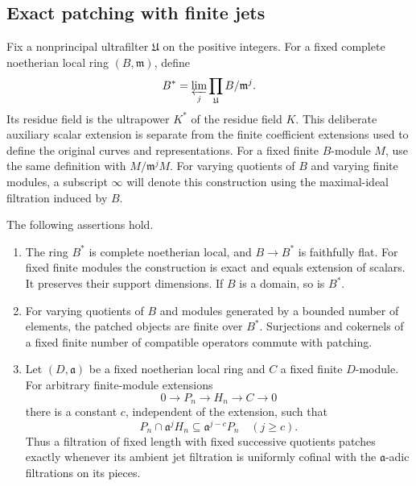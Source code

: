 \subsection{Exact patching with finite jets}

Fix a nonprincipal ultrafilter $\mathfrak U$ on the positive integers.
For a fixed complete noetherian local ring $(B,\mathfrak m)$, define
\[
 B^*=\varprojlim_j\prod_{\mathfrak U} B/\mathfrak m^j.
\]
Its residue field is the ultrapower $K^*$ of the residue field $K$.
This deliberate auxiliary scalar extension is separate from the
finite coefficient extensions used to define the original curves
and representations.
For a fixed finite $B$-module $M$, use the same definition with
$M/\mathfrak m^jM$.  For varying quotients of $B$ and varying finite
modules, a subscript $\infty$ will denote this construction using
the maximal-ideal filtration induced by $B$.

\begin{lemma}\label{lem:jet-exactness}
The following assertions hold.
\begin{enumerate}
\item The ring $B^*$ is complete noetherian local, and $B\to B^*$
is faithfully flat.  For fixed finite modules the construction is
exact and equals extension of scalars.  It preserves their support
dimensions.  If $B$ is a domain, so is $B^*$.
\item For varying quotients of $B$ and modules generated by a bounded
number of elements, the patched objects are finite over $B^*$.
Surjections and cokernels of a fixed finite number of compatible
operators commute with patching.
\item Let $(D,\mathfrak a)$ be a fixed noetherian local ring and $C$
a fixed finite $D$-module.  For arbitrary finite-module extensions
\[
 0\longrightarrow P_n\longrightarrow H_n\longrightarrow C
 \longrightarrow0
\]
there is a constant $c$, independent of the extension, such that
\begin{equation}\label{eq:uniform-artin-rees}
 P_n\cap\mathfrak a^jH_n\subseteq\mathfrak a^{j-c}P_n
 \quad(j\geq c).
\end{equation}
Thus a filtration of fixed length with fixed successive quotients
patches exactly whenever its ambient jet filtration is uniformly
cofinal with the $\mathfrak a$-adic filtrations on its pieces.
\end{enumerate}
\end{lemma}

